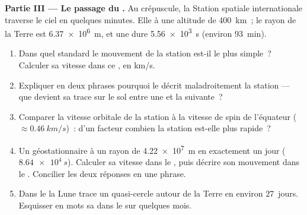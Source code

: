 \begin{problem}
\medskip
\noindent\textbf{Partie III --- Le passage du .}
Au crépuscule, la Station spatiale internationale traverse le ciel en
quelques minutes. Elle  à une altitude de
\qty{400}{km}~; le rayon de la Terre est \qty{6.37e6}{m}, et une
 dure \qty{5.56e3}{s} (environ \qty{93}{min}).
\begin{enumerate}[resume]
  \item Dans quel  standard le mouvement de la station est-il
        le plus simple~? Calculer sa vitesse dans ce , en
        \unit{km/s}.
  \item Expliquer en deux phrases pourquoi le
         décrit maladroitement la station ---
        que devient sa trace sur le sol entre une
         et la suivante~?
  \item Comparer la vitesse orbitale de la station à la vitesse de
        spin de l'équateur ($\approx \qty{0.46}{km/s}$)~: d'un facteur
        combien la station est-elle plus rapide~?
  \item Un  géostationnaire  à un
        rayon de \qty{4.22e7}{m} en exactement un jour
        ($\qty{8.64e4}{s}$). Calculer sa vitesse dans le
        , puis décrire son mouvement dans
        le . Concilier les deux réponses en une
        phrase.
  \item Dans le  la Lune trace un
        quasi-cercle autour de la Terre en environ $27$~jours. Esquisser
        en mots sa  dans le
         sur quelques mois.
\end{enumerate}


\end{problem}
